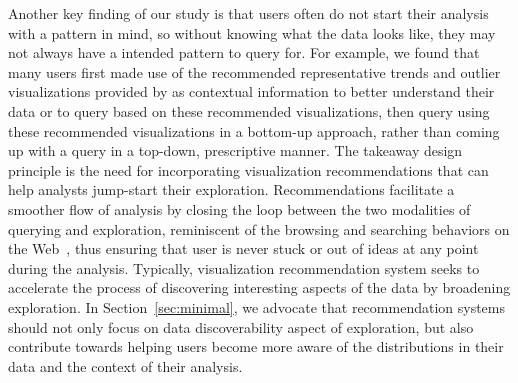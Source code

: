 \par Another key finding of our study is that users often do not start their analysis with a pattern in mind, so without knowing what the data looks like, they may not always have a intended pattern to query for. For example, we found that many users first made use of the recommended representative trends and outlier visualizations provided by \zv as contextual information to better understand their data or to query based on these recommended visualizations, then query using these recommended visualizations in a bottom-up approach, rather than coming up with a query in a top-down, prescriptive manner. The takeaway design principle is the need for incorporating visualization recommendations that can help analysts jump-start their exploration.  Recommendations facilitate a smoother flow of analysis by closing the loop between the two modalities of querying and exploration, reminiscent of the browsing and searching behaviors on the Web~\cite{Olston2003}, thus ensuring that user is never stuck or out of ideas at any point during the analysis. Typically, visualization recommendation system seeks to accelerate the process of discovering interesting aspects of the data by broadening exploration. In Section~\ref{sec:minimal}, we advocate that recommendation systems should not only focus on data discoverability aspect of exploration, but also contribute towards helping users become more aware of the distributions in their data and the context of their analysis.

